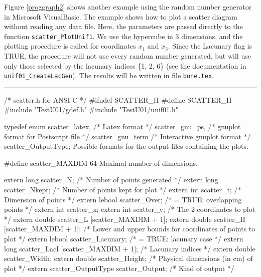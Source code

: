 Figure \ref{proggraph2} shows another example using the 
random number generator in Microsoft VisualBasic. The example
shows how to plot a scatter diagram without reading any data file.
Here, the parameters are passed directly to the function 
{\tt scatter\_PlotUnif1}.
We use the hypercube in 3 dimensions, and the 
 plotting procedure is called for coordinates $x_1$ and $x_{3}$.
 Since the Lacunary flag is TRUE,
the procedure will not use every random number generated, but will
use only those selected by the lacunary indices \{1, 2, 6\}  
(see the documentation in {\tt unif01\_CreateLacGen}).
The results will be written in file {\tt bone.tex}.

\vspace{10mm}
\bigskip
\hrule
\code
\hide
/* scatter.h  for ANSI C */
#ifndef SCATTER_H
#define SCATTER_H
\endhide
#include "TestU01/gdef.h"
#include "TestU01/unif01.h"
\endcode



\code

typedef enum {
   scatter_latex,                 /* Latex format */
   scatter_gnu_ps,                /* gnuplot format for Postscript file */   
   scatter_gnu_term               /* Interactive gnuplot format */
   } scatter_OutputType;
\endcode
 \tab
  Possible formats for the output files containing the plots.
 \endtab


\code

#define scatter_MAXDIM 64
\endcode
 \tab
  Maximal number of dimensions.
 \endtab

\ifdetailed  %

\code

extern long scatter_N;             /* Number of points generated */
extern long scatter_Nkept;         /* Number of points kept for plot */
extern int scatter_t;              /* Dimension of points */
extern lebool scatter_Over;        /* = TRUE: overlapping points */
extern int scatter_x;
extern int scatter_y;              /* The 2 coordinates to plot */
extern double scatter_L [scatter_MAXDIM + 1];
extern double scatter_H [scatter_MAXDIM + 1];
                                   /* Lower and upper bounds for coordinates
                                      of points to plot */
\endcode
\code
extern lebool scatter_Lacunary;    /* = TRUE: lacunary case */
extern long scatter_LacI [scatter_MAXDIM + 1];  /* Lacunary indices */
extern double scatter_Width;
extern double scatter_Height;      /* Physical dimensions (in cm) of plot */
extern scatter_OutputType scatter_Output;       /* Kind of output */
\endcode

